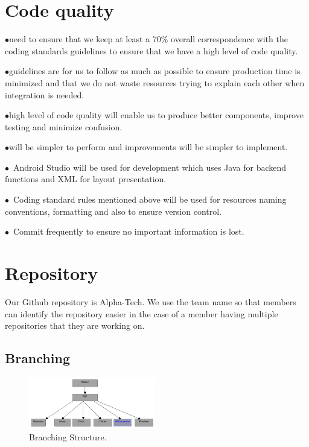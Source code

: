\documentclass[english]{article}
\begin{document}
\section{Code quality}
$\bullet$\We need to ensure that we keep at least a 70\% overall correspondence with the coding standards guidelines to ensure that we have a high level of code quality.\par
$\bullet$\These guidelines are for us to follow as much as possible to ensure production time is minimized and that we do not waste resources trying to explain each other when integration is needed.\par
$\bullet$\A high level of code quality will enable us to produce better components, improve testing and minimize confusion. \par 
$\bullet$\Reviews will be simpler to perform and improvements will be simpler to implement.\par
$\bullet$\ Android Studio will be used for development which uses Java for backend functions and XML for layout presentation. \par
$\bullet$\ Coding standard rules mentioned above will be used for resources naming conventions, formatting and also to ensure version control.
 \par
 $\bullet$\ Commit frequently to ensure no important information is lost.
 \par

\section{Repository}
Our Github repository is Alpha-Tech. We use the team name so that members can identify the repository easier in the case of a member having multiple repositories that they are working on. 
\subsection{Branching}		

\begin{figure}
	\caption{Branching Structure.}
	\label{wrap-fig:7}
	\includegraphics[width=5.5cm]{images/Branching.png}
\end{figure} 
\end{document}

